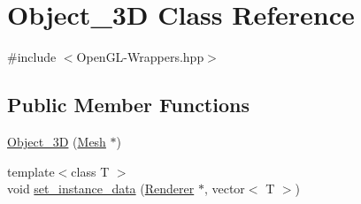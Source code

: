 \hypertarget{classObject__3D}{}\section{Object\+\_\+3D Class Reference}
\label{classObject__3D}


{\ttfamily \#include $<$Open\+G\+L-\/\+Wrappers.\+hpp$>$}

\subsection*{Public Member Functions}
\begin{DoxyCompactItemize}
\item 
\mbox{\hyperlink{classObject__3D_a818bdde880dd695da08c3e23691caa59}{Object\+\_\+3D}} (\mbox{\hyperlink{structMesh}{Mesh}} $\ast$)
\item 
{\footnotesize template$<$class T $>$ }\\void \mbox{\hyperlink{classObject__3D_acde5ca17a5d5806291c8235e20302733}{set\+\_\+instance\+\_\+data}} (\mbox{\hyperlink{classRenderer}{Renderer}} $\ast$, vector$<$ T $>$)
\end{DoxyCompactItemize}
